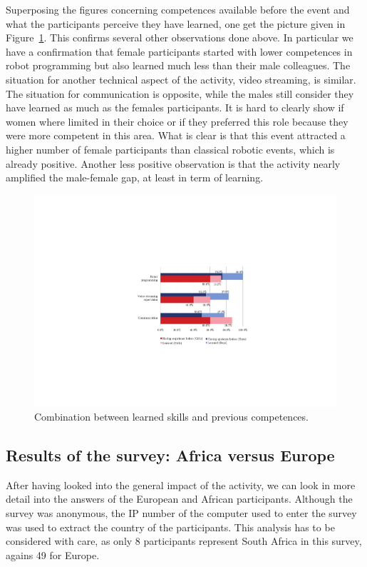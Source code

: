 \documentclass{intech-journal}
\begin{document}
Superposing the figures concerning competences available before the event and what the participants perceive they have learned, one get the picture given in Figure~\ref{fig:learned}.
This confirms several other observations done above.
In particular we have a confirmation that female participants started with lower competences in robot programming but also learned much less than their male colleagues. 
The situation for another technical aspect of the activity, video streaming, is similar. 
The situation for communication is opposite, while the males still consider they have learned as much as the females participants. 
It is hard to clearly show if women where limited in their choice or if they preferred this role because they were more competent in this area. 
What is clear is that this event attracted a higher number of female participants than classical robotic events, which is already positive.
Another less positive observation is that the activity nearly amplified the male-female gap, at least in term of learning. 


\begin{figure}[ht]
 \centering
    \includegraphics[width=0.6\columnwidth]{figures/learned.pdf}
  \caption{Combination between learned skills and previous competences.}
  \label{fig:learned} 
\end{figure}

\subsection{Results of the survey: Africa versus Europe}

After having looked into the general impact of the activity, we can look in more detail into the answers of the European and African participants. 
Although the survey was anonymous, the IP number of the computer used to enter the survey was used to extract the country of the participants.
This analysis has to be considered with care, as only 8 participants represent South Africa in this survey, agains 49 for Europe.
\end{document}
